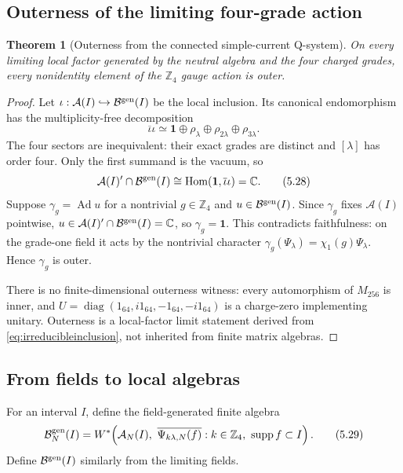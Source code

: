 \documentclass[11pt]{article}
\newtheorem{theorem}{Theorem}[section]
\theoremstyle{remark}
\newcommand{\A}{\mathcal A}
\newcommand{\B}{\mathcal B}
\newcommand{\C}{\mathbb C}
\newcommand{\Z}{\mathbb Z}
\newcommand{\id}{\mathbf 1}
\newcommand{\supp}{\operatorname{supp}}
\begin{document}
\subsection{Outerness of the limiting four-grade action}

\begin{theorem}[Outerness from the connected simple-current Q-system]
\label{thm:outerness}
On every limiting local factor generated by the neutral algebra and the
four charged grades, every nonidentity element of the $\Z_4$ gauge
action is outer.
\end{theorem}

\begin{proof}
Let $\iota:\A(I)\hookrightarrow\B^{\rm gen}(I)$ be the local inclusion.
Its canonical endomorphism has the multiplicity-free decomposition
\[
 \overline\iota\iota
 \simeq\id\oplus\rho_\lambda\oplus\rho_{2\lambda}
              \oplus\rho_{3\lambda}.
\tag{5.27}\label{eq:canonicalendo}
\]
The four sectors are inequivalent: their exact grades are distinct and
$[\lambda]$ has order four.  Only the first summand is the vacuum, so
\[
 \A(I)'\cap\B^{\rm gen}(I)
 \cong\operatorname{Hom}(\id,\overline\iota\iota)=\C.
\tag{5.28}\label{eq:irreducibleinclusion}
\]
Suppose $\gamma_g=\operatorname{Ad}u$ for a nontrivial $g\in\Z_4$ and
$u\in\B^{\rm gen}(I)$.  Since $\gamma_g$ fixes $\A(I)$ pointwise,
$u\in\A(I)'\cap\B^{\rm gen}(I)=\C$, so $\gamma_g=\id$.  This contradicts
faithfulness: on the grade-one field it acts by the nontrivial character
$\gamma_g(\Psi_\lambda)=\chi_1(g)\Psi_\lambda$.  Hence $\gamma_g$ is
outer.

There is no finite-dimensional outerness witness: every automorphism of
$M_{256}$ is inner, and
$U=\operatorname{diag}(1_{64},i1_{64},-1_{64},-i1_{64})$ is a
charge-zero implementing unitary.  Outerness is a local-factor limit
statement derived from \eqref{eq:irreducibleinclusion}, not inherited
from finite matrix algebras.
\end{proof}

\subsection{From fields to local algebras}

For an interval $I$, define the field-generated finite algebra
\[
 \B_N^{\rm gen}(I)
 =W^*\!\left(
 \A_N(I),\
 \overline{\Psi_{k\lambda,N}(f)}:
 k\in\Z_4,\ \supp f\subset I
 \right).
\tag{5.29}\label{eq:generatedfinite}
\]
Define $\B^{\rm gen}(I)$ similarly from the limiting fields.
\end{document}
